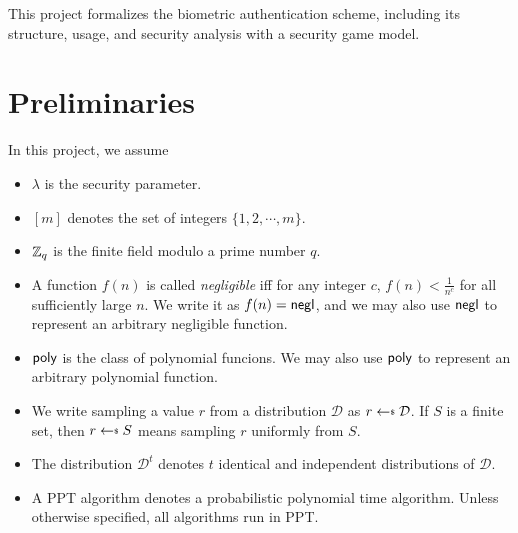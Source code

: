 







\maketitle


\pagestyle{fancy}
\fancyhf{}
\fancyfoot[C]{\thepage}


This project formalizes the biometric authentication scheme, including its structure, usage, and security analysis with a security game model.


\section{Preliminaries}
\label{sec:preliminaries}

In this project, we assume

\begin{itemize}
	
	\item $\lambda$ is the security parameter.

	\item $[m]$ denotes the set of integers $\{1, 2, \cdots, m\}$.

	\item $\mathbb{Z}_q$ is the finite field modulo a prime number $q$.

	\item A function $f(n)$ is called \emph{negligible} iff for any integer $c$, $f(n) < \frac{1}{n^c}$ for all sufficiently large $n$. We write it as $f(n) = \mathsf{negl}$, and we may also use $\mathsf{negl}$ to represent an arbitrary negligible function.
	
	\item $\mathsf{poly}$ is the class of polynomial funcions. We may also use $\mathsf{poly}$ to represent an arbitrary polynomial function.
	
	\item We write sampling a value $r$ from a distribution $\mathcal{D}$ as $r \getsdollar \mathcal{D}$. If $S$ is a finite set, then $r \getsdollar S$ means sampling $r$ uniformly from $S$.

	\item The distribution $\mathcal{D}^t$ denotes $t$ identical and independent distributions of $\mathcal{D}$.

	\item A PPT algorithm denotes a probabilistic polynomial time algorithm. Unless otherwise specified, all algorithms run in PPT.

\end{itemize}

